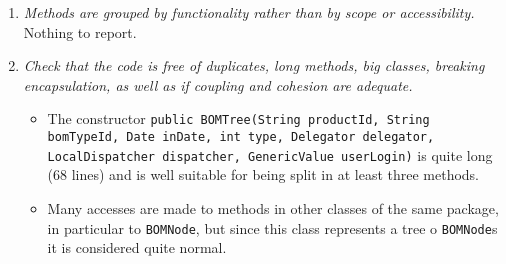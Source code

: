 \begin{enumerate}
			\item \textit{Methods are grouped by functionality rather than by scope or accessibility.}\newline
			Nothing to report. %

			\item \textit{Check that the code is free of duplicates, long methods, big classes, breaking encapsulation, as well as if coupling and cohesion are adequate.}
			\begin{itemize}
				\item The constructor \texttt{public BOMTree(String productId, String bomTypeId, Date inDate, int type, Delegator delegator, LocalDispatcher dispatcher, GenericValue userLogin)} is quite long (68 lines) and is well suitable for being split in at least three methods.
				\item Many accesses are made to methods in other classes of the same package, in particular to \texttt{BOMNode}, but since this class represents a tree o \texttt{BOMNode}s it is considered quite normal.
			\end{itemize}
		\end{enumerate}

